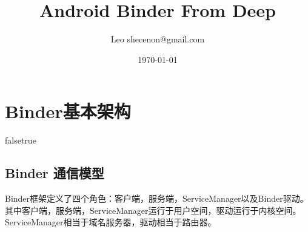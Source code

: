 \documentclass[a4paper,11pt]{article}
\title{Android Binder From Deep}
\author{Leo shecenon@gmail.com}
\date{\today}
\begin{document}
\maketitle
\renewcommand{\refname}{参考文献}
\renewcommand\contentsname{目录}
\renewcommand\listfigurename{插图目录}
\renewcommand\listtablename{表格目录}
\renewcommand\indexname{索引}
\renewcommand\appendixname{附录}
\renewcommand\figurename{图}
\renewcommand\tablename{表}
\renewcommand{\lstlistlistingname}{代码列表集}
\renewcommand{\lstlistingname}{代码}


\setlength{\columnsep}{.8cm}
\setlength{\parskip}{1ex}
\tableofcontents
\makeatletter
\newcommand{\figcaption}{\def\@captype{figure}\caption}
\newcommand{\tabcaption}{\def\@captype{table}\caption}
\makeatother

\def\call#1{\\* {\indent #1 \\*\noindent}} 
\newcommand{\various}[1]{{\color{cyan}\textit{#1}}}
\def\binder{{\color{red}binder }}

\setlength{\leftmargin}{1.2em}     %
\setlength{\parsep}{0ex}         %
\setlength{\topsep}{1ex}         %
\setlength{\itemsep}{0.5ex}        %
\setlength{\labelsep}{0.3em}     %
\setlength{\itemindent}{1.1em}    %
\setlength{\listparindent}{0em} %

\section{Binder基本架构}

\def\oo{false}
\if \oo true
\fi

\subsection{ Binder 通信模型}
Binder框架定义了四个角色：客户端，服务端，ServiceManager以及Binder驱动。
其中客户端，服务端，ServiceManager运行于用户空间，驱动运行于内核空间。
ServiceManager相当于域名服务器，驱动相当于路由器。
\end{document}
